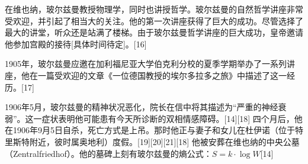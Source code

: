 在维也纳，玻尔兹曼教授物理学，同时也讲授哲学。玻尔兹曼的自然哲学讲座非常受欢迎，并引起了相当大的关注。他的第一次讲座获得了巨大的成功。尽管选择了最大的讲堂，听众还是站满了楼梯。由于玻尔兹曼哲学讲座的巨大成功，皇帝邀请他参加宫殿的接待[具体时间待定]。[16]

1905年，玻尔兹曼应邀在加利福尼亚大学伯克利分校的夏季学期举办了一系列讲座，他在一篇受欢迎的文章《一位德国教授的埃尔多拉多之旅》中描述了这一经历。[17]

1906年5月，玻尔兹曼的精神状况恶化，院长在信中将其描述为“严重的神经衰弱”。这一症状表明他可能患有今天所诊断的双相情感障碍。[14][18] 四个月后，他在1906年9月5日自杀，死亡方式是上吊。那时他正与妻子和女儿在杜伊诺（位于特里斯特附近，彼时属奥地利）度假。[19][20][21][18] 他被安葬在维也纳的中央公墓（Zentralfriedhof）。他的墓碑上刻有玻尔兹曼的熵公式：\( S = k \cdot \log W \)[14]